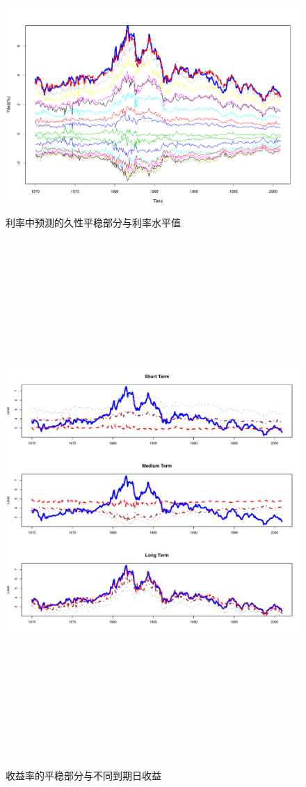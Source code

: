    \begin{figure}%
      \includegraphics[width=15cm,height=8cm]{figures/Rplot06}
     \caption{利率中预测的久性平稳部分与利率水平值}
     \label{Rplot06}
    \end{figure} 
  \begin{figure}%
      \includegraphics[width=15cm,height=20cm]{figures/Rplot07}
     \caption{收益率的平稳部分与不同到期日收益}
     \label{Rplot07}
 \end{figure}
   
